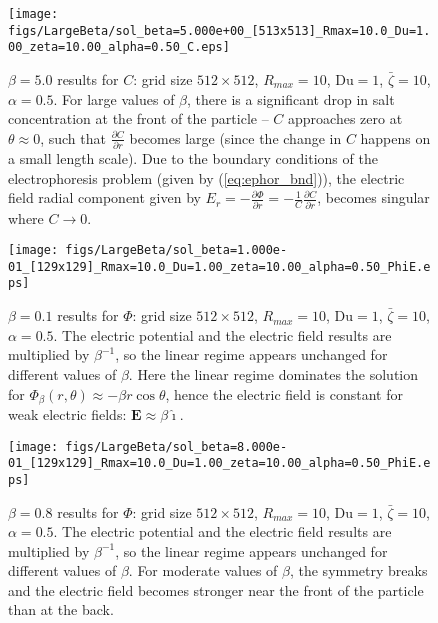 \documentclass[MSc,beforeExam]{iitcsthesis}
\newcommand{\deriv}[2]{\frac{\partial #1}{\partial #2}}
\newcommand\bE{\boldsymbol{E}}
\newcommand\Du{\text{Du}}
\newcommand\ui{\boldsymbol{\hat{\imath}}}
\begin{document}
\begin{figure}
    \begin{center}
    \texttt{[image: figs/LargeBeta/sol\_beta=5.000e+00\_[513x513]\_Rmax=10.0\_Du=1.00\_zeta=10.00\_alpha=0.50\_C.eps]}
        \caption[$\beta = 5.0$ results for $C$]
        {$\beta = 5.0$ results for $C$: grid size $512 \times 512$, 
        $R_{max} = 10$, $\Du = 1$, $\bar\zeta = 10$, $\alpha = 0.5$.
        For large values of $\beta$, there is a significant drop in
        salt concentration at the front of the particle -- 
        $C$ approaches zero at $\theta \approx 0$, such that 
        $\deriv{C}{r}$ becomes large 
        (since the change in $C$ happens on a small length scale).
        Due to the boundary conditions of the electrophoresis problem
        (given by (\ref{eq:ephor_bnd})), the electric field radial
        component given by 
        $E_r = -\deriv{\varPhi}{r} = -\frac{1}{C}\deriv{C}{r}$, 
        becomes singular where $C \rightarrow 0$.
        }
	    \label{fig:LargeBeta_C3}	    
    \end{center}
\end{figure}

\begin{figure}
    \begin{center}
    \texttt{[image: figs/LargeBeta/sol\_beta=1.000e-01\_[129x129]\_Rmax=10.0\_Du=1.00\_zeta=10.00\_alpha=0.50\_PhiE.eps]}
        \caption[$\beta = 0.1$ results for $\varPhi$]
        {$\beta = 0.1$ results for $\varPhi$:
        grid size $512 \times 512$, $R_{max} = 10$, $\Du = 1$, $\bar\zeta = 10$, $\alpha = 0.5$. 
        The electric potential and the electric field results are multiplied by $\beta^{-1}$,
	    so the linear regime appears unchanged for different values of $\beta$.
        Here the linear regime dominates the solution for 
        $\varPhi_\beta(r, \theta) \approx -\beta {r \cos\theta}$,
        hence the electric field is constant for weak electric fields:
        $\bE \approx \beta \ui$.}
	    \label{fig:LargeBeta_Phi1}
    \end{center}
\end{figure}

\begin{figure}
    \begin{center}
    \texttt{[image: figs/LargeBeta/sol\_beta=8.000e-01\_[129x129]\_Rmax=10.0\_Du=1.00\_zeta=10.00\_alpha=0.50\_PhiE.eps]}
        \caption[$\beta = 0.8$ results for $\varPhi$]
        {$\beta = 0.8$ results for $\varPhi$:
        grid size $512 \times 512$, $R_{max} = 10$, $\Du = 1$, 
        $\bar\zeta = 10$, $\alpha = 0.5$. 
	    The electric potential and the electric field results are multiplied by $\beta^{-1}$,
	    so the linear regime appears unchanged for different values of $\beta$.
        For moderate values of $\beta$,
        the symmetry breaks and the electric field becomes stronger 
        near the front of the particle than at the back.}
	    \label{fig:LargeBeta_Phi2}
    \end{center}
\end{figure}
\end{document}
